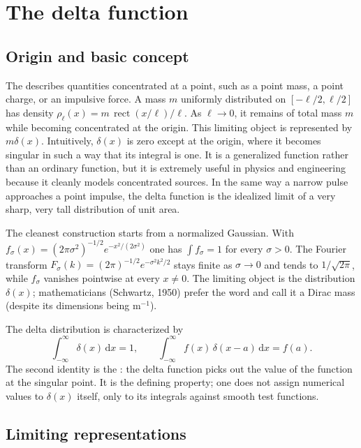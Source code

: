\section{The delta function}

\subsection{Origin and basic concept}

The  describes quantities concentrated at a point, such as a point mass, a point charge, or an impulsive force. A mass $m$ uniformly distributed on $[-\ell/2,\ell/2]$ has density $\rho_\ell(x)=m\,\operatorname{rect}(x/\ell)/\ell$. As $\ell\to0$, it remains of total mass $m$ while becoming concentrated at the origin. This limiting object is represented by $m\delta(x)$. Intuitively, $\delta(x)$ is zero except at the origin, where it becomes singular in such a way that its integral is one. It is a generalized function rather than an ordinary function, but it is extremely useful in physics and engineering because it cleanly models concentrated sources. In the same way a narrow pulse approaches a point impulse, the delta function is the idealized limit of a very sharp, very tall distribution of unit area.

The cleanest construction starts from a normalized Gaussian. With $f_\sigma(x)=(2\pi\sigma^2)^{-1/2}e^{-x^2/(2\sigma^2)}$ one has $\int f_\sigma = 1$ for every $\sigma>0$. The Fourier transform $F_\sigma(k)=(2\pi)^{-1/2}e^{-\sigma^2k^2/2}$ stays finite as $\sigma\to 0$ and tends to $1/\sqrt{2\pi}$, while $f_\sigma$ vanishes pointwise at every $x\neq 0$. The limiting object is the  distribution $\delta(x)$; mathematicians (Schwartz, 1950) prefer the word  and call it a Dirac mass (despite its dimensions being $\mathrm{m}^{-1}$).

The delta distribution is characterized by
\begin{equation}
\int_{-\infty}^{\infty}\delta(x)\,\mathrm{d}x=1,
\qquad
\int_{-\infty}^{\infty}f(x)\,\delta(x-a)\,\mathrm{d}x=f(a).
\end{equation}
The second identity is the : the delta function picks out the value of the function at the singular point. It is the defining property; one does not assign numerical values to $\delta(x)$ itself, only to its integrals against smooth test functions.

\subsection{Limiting representations}

